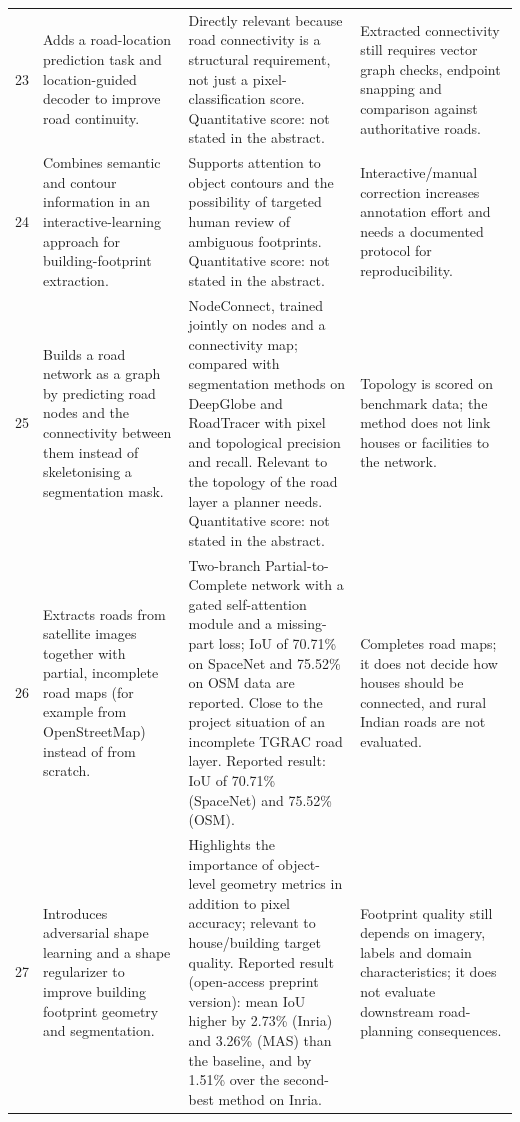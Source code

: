 \begin{landscape}
\begin{longtable}{@{}L{0.6cm}L{7.5cm}L{8.0cm}L{7.5cm}@{}}
23 & Adds a road-location prediction task and location-guided decoder to improve road continuity. & Directly relevant because road connectivity is a structural requirement, not just a pixel-classification score. Quantitative score: not stated in the abstract. & Extracted connectivity still requires vector graph checks, endpoint snapping and comparison against authoritative roads.  \\
24 & Combines semantic and contour information in an interactive-learning approach for building-footprint extraction. & Supports attention to object contours and the possibility of targeted human review of ambiguous footprints. Quantitative score: not stated in the abstract. & Interactive/manual correction increases annotation effort and needs a documented protocol for reproducibility.  \\
25 & Builds a road network as a graph by predicting road nodes and the connectivity between them instead of skeletonising a segmentation mask. & NodeConnect, trained jointly on nodes and a connectivity map; compared with segmentation methods on DeepGlobe and RoadTracer with pixel and topological precision and recall. Relevant to the topology of the road layer a planner needs. Quantitative score: not stated in the abstract. & Topology is scored on benchmark data; the method does not link houses or facilities to the network.  \\
26 & Extracts roads from satellite images together with partial, incomplete road maps (for example from OpenStreetMap) instead of from scratch. & Two-branch Partial-to-Complete network with a gated self-attention module and a missing-part loss; IoU of 70.71\% on SpaceNet and 75.52\% on OSM data are reported. Close to the project situation of an incomplete TGRAC road layer. Reported result: IoU of 70.71\% (SpaceNet) and 75.52\% (OSM). & Completes road maps; it does not decide how houses should be connected, and rural Indian roads are not evaluated.  \\
27 & Introduces adversarial shape learning and a shape regularizer to improve building footprint geometry and segmentation. & Highlights the importance of object-level geometry metrics in addition to pixel accuracy; relevant to house/building target quality. Reported result (open-access preprint version): mean IoU higher by 2.73\% (Inria) and 3.26\% (MAS) than the baseline, and by 1.51\% over the second-best method on Inria. & Footprint quality still depends on imagery, labels and domain characteristics; it does not evaluate downstream road-planning consequences.  \\

\end{longtable}
\end{landscape}
